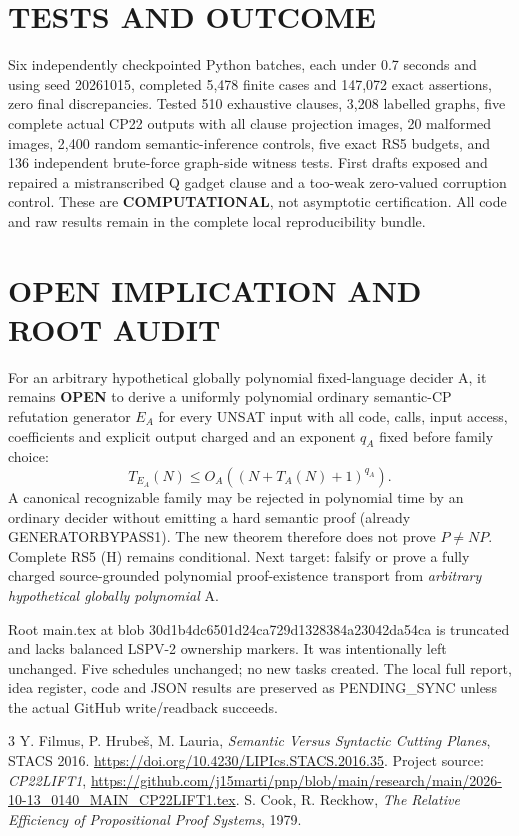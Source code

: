 \documentclass[11pt]{article}
\begin{document}
\section{TESTS AND OUTCOME}
Six independently checkpointed Python batches, each under 0.7 seconds and using seed 20261015, completed 5,478 finite cases and 147,072 exact assertions, zero final discrepancies. Tested 510 exhaustive clauses, 3,208 labelled graphs, five complete actual CP22 outputs with all clause projection images, 20 malformed images, 2,400 random semantic-inference controls, five exact RS5 budgets, and 136 independent brute-force graph-side witness tests. First drafts exposed and repaired a mistranscribed Q gadget clause and a too-weak zero-valued corruption control. These are \textbf{COMPUTATIONAL}, not asymptotic certification. All code and raw results remain in the complete local reproducibility bundle.

\section{OPEN IMPLICATION AND ROOT AUDIT}
For an arbitrary hypothetical globally polynomial fixed-language decider A, it remains \textbf{OPEN} to derive a uniformly polynomial ordinary semantic-CP refutation generator $E_A$ for every UNSAT input with all code, calls, input access, coefficients and explicit output charged and an exponent $q_A$ fixed before family choice:
\[
T_{E_A}(N)\le O_A((N+T_A(N)+1)^{q_A}).
\]
A canonical recognizable family may be rejected in polynomial time by an ordinary decider without emitting a hard semantic proof (already GENERATORBYPASS1). The new theorem therefore does not prove $P\ne NP$. Complete RS5 (H) remains conditional. Next target: falsify or prove a fully charged source-grounded polynomial proof-existence transport from \emph{arbitrary hypothetical globally polynomial} A.

Root main.tex at blob 30d1b4dc6501d24ca729d1328384a23042da54ca is truncated and lacks balanced LSPV-2 ownership markers. It was intentionally left unchanged. Five schedules unchanged; no new tasks created. The local full report, idea register, code and JSON results are preserved as PENDING_SYNC unless the actual GitHub write/readback succeeds.

\begin{thebibliography}{3}
 Y. Filmus, P. Hrube\v{s}, M. Lauria, \emph{Semantic Versus Syntactic Cutting Planes}, STACS 2016. \url{https://doi.org/10.4230/LIPIcs.STACS.2016.35}.
 Project source: \emph{CP22LIFT1}, \url{https://github.com/j15marti/pnp/blob/main/research/main/2026-10-13_0140_MAIN_CP22LIFT1.tex}.
 S. Cook, R. Reckhow, \emph{The Relative Efficiency of Propositional Proof Systems}, 1979.
\end{thebibliography}
\end{document}
